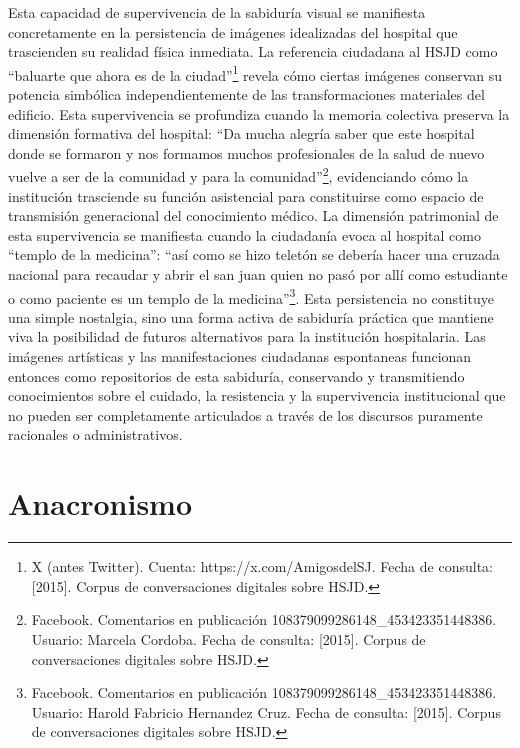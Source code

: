 Esta capacidad de supervivencia de la sabiduría visual se manifiesta concretamente en la persistencia de imágenes idealizadas del hospital que trascienden su realidad física inmediata. La referencia ciudadana al HSJD como ``baluarte que ahora es de la ciudad''\footnote{X (antes Twitter). Cuenta: https://x.com/AmigosdelSJ. Fecha de consulta: [2015]. Corpus de conversaciones digitales sobre HSJD.} revela cómo ciertas imágenes conservan su potencia simbólica independientemente de las transformaciones materiales del edificio. Esta supervivencia se profundiza cuando la memoria colectiva preserva la dimensión formativa del hospital: ``Da mucha alegría saber que este hospital donde se formaron y nos formamos muchos profesionales de la salud de nuevo vuelve a ser de la comunidad y para la comunidad''\footnote{Facebook. Comentarios en publicación 108379099286148\_453423351448386. Usuario: Marcela Cordoba. Fecha de consulta: [2015]. Corpus de conversaciones digitales sobre HSJD.}, evidenciando cómo la institución trasciende su función asistencial para constituirse como espacio de transmisión generacional del conocimiento médico. La dimensión patrimonial de esta supervivencia se manifiesta cuando la ciudadanía evoca al hospital como ``templo de la medicina'': ``así como se hizo teletón se debería hacer una cruzada nacional para recaudar y abrir el san juan quien no pasó por allí como estudiante o como paciente es un templo de la medicina''\footnote{Facebook. Comentarios en publicación 108379099286148\_453423351448386. Usuario: Harold Fabricio Hernandez Cruz. Fecha de consulta: [2015]. Corpus de conversaciones digitales sobre HSJD.}. Esta persistencia no constituye una simple nostalgia, sino una forma activa de sabiduría práctica que mantiene viva la posibilidad de futuros alternativos para la institución hospitalaria. Las imágenes artísticas y las manifestaciones ciudadanas espontaneas funcionan entonces como repositorios de esta sabiduría, conservando y transmitiendo conocimientos sobre el cuidado, la resistencia y la supervivencia institucional que no pueden ser completamente articulados a través de los discursos puramente racionales o administrativos.

\section{Anacronismo}

